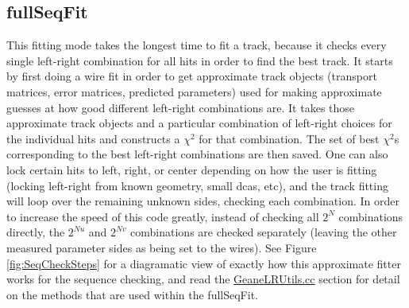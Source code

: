 	\subsection{fullSeqFit}

      This fitting mode takes the longest time to fit a track, because it checks every single left-right combination for all hits in order to find the best track. It starts by first doing a wire fit in order to get approximate track objects (transport matrices, error matrices, predicted parameters) used for making approximate guesses at how good different left-right combinations are. It takes those approximate track objects and a particular combination of left-right choices for the individual hits and constructs a $\chi^{2}$ for that combination. The set of best $\chi^{2}$s corresponding to the best left-right combinations are then saved. One can also lock certain hits to left, right, or center depending on how the user is fitting (locking left-right from known geometry, small dcas, etc), and the track fitting will loop over the remaining unknown sides, checking each combination. In order to increase the speed of this code greatly, instead of checking all $2^{N}$ combinations directly, the $2^{Nu}$ and $2^{Nv}$ combinations are checked separately (leaving the other measured parameter sides as being set to the wires). See Figure \ref{fig:SeqCheckSteps} for a diagramatic view of exactly how this approximate fitter works for the sequence checking, and read the \hyperref[sec:GeaneLRUtils]{GeaneLRUtils.cc} section for detail on the methods that are used within the fullSeqFit.

